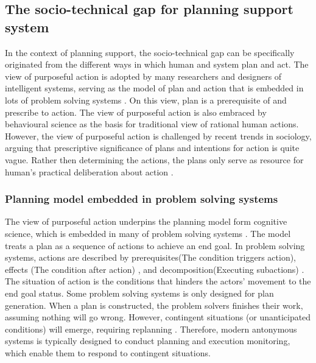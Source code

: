 \subsection{The socio-technical gap for planning support system}
In the context of planning support, the socio-technical gap can be specifically originated from the different ways in which human and system plan and act. The view of purposeful action is adopted by many researchers and designers of intelligent systems, serving as the model of plan and action that is embedded in lots of problem solving systems \cite{Allen1984}. On this view, plan is a prerequisite of and prescribe to action. The view of purposeful action is also embraced by behavioural science as the basis for traditional view of rational human actions. However, the view of purposeful action is challenged by recent trends in sociology, arguing that prescriptive significance of plans and intentions for action is quite vague. Rather then determining the actions, the plans only serve as resource for human's practical deliberation about action \cite{Suchman1987}.\\  

\subsubsection{Planning model embedded in problem solving systems }
The view of purposeful action underpins the planning model form cognitive science, which is embedded in many of problem solving systems \cite{Suchman1987}. The model treats a plan as a sequence of actions to achieve an end goal. In problem solving systems, actions are described by prerequisites(The condition triggers action), effects (The condition after action) , and decomposition(Executing subactions) \cite{Allen1984}. The situation of action is the conditions that hinders the actors' movement to the end goal status. Some problem solving systems is only designed for plan generation. When a plan is constructed, the problem solvers finishes their work, assuming nothing will go wrong. However, contingent situations (or unanticipated conditions) will emerge, requiring replanning \cite{Suchman1987}. Therefore, modern antonymous systems is typically designed to conduct planning and execution monitoring, which enable them to respond to contingent situations.\\


